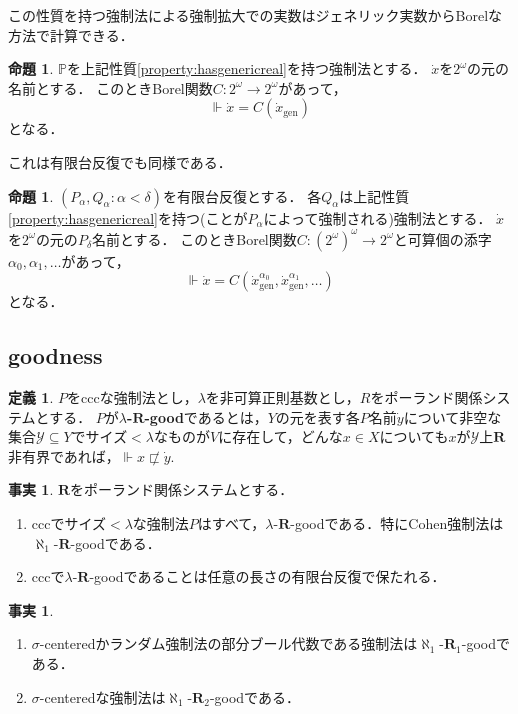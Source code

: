\documentclass[uplatex,dvipdfmx]{jsarticle}
\renewcommand{\P}{\mathbb{P}}
\newcommand\forces{\Vdash}
\newcommand{\relR}{\mathbf{R}}
\renewcommand\subset{\subseteq}
\theoremstyle{definition}
\newtheorem{defi}[thm]{定義}
\newtheorem{fact}[thm]{事実}
\newtheorem{prop}[thm]{命題}
\begin{document}
		この性質を持つ強制法による強制拡大での実数はジェネリック実数からBorelな方法で計算できる．
		\begin{prop}
			$\P$を上記性質\ref{property:hasgenericreal}を持つ強制法とする．
			$\dot{x}$を$2^\omega$の元の名前とする．
			このときBorel関数$C \colon 2^\omega \to 2^\omega$があって，
			\[
			\forces \dot{x} = C(\dot{x}_\mathrm{gen})
			\]
			となる．
		\end{prop}
	
		これは有限台反復でも同様である．
		\begin{prop}
		$(P_\alpha, Q_\alpha : \alpha < \delta)$を有限台反復とする．
		各$Q_\alpha$は上記性質\ref{property:hasgenericreal}を持つ(ことが$P_\alpha$によって強制される)強制法とする．
		$\dot{x}$を$2^\omega$の元の$P_\delta$名前とする．
		このときBorel関数$C \colon (2^\omega)^\omega \to 2^\omega$と可算個の添字$\alpha_0, \alpha_1, \dots$があって，
		\[
		\forces \dot{x} = C(\dot{x}_\mathrm{gen}^{\alpha_0}, \dot{x}_\mathrm{gen}^{\alpha_1}, \dots)
		\]
		となる．
		\end{prop}
		
	\subsection{goodness}
	
	\begin{defi}
		$P$をcccな強制法とし，$\lambda$を非可算正則基数とし，$R$をポーランド関係システムとする．
		$P$が\textbf{$\lambda$-$\relR$-good}であるとは，$Y$の元を表す各$P$名前$\dot{y}$について非空な集合$\mathscr{Y} \subset Y$でサイズ$<\lambda$なものが$V$に存在して，どんな$x \in X$についても$x$が$\mathscr{Y}$上$\relR$非有界であれば，$\forces x \not \sqsubset \dot{y}$.
	\end{defi}

	\begin{fact}
		$\relR$をポーランド関係システムとする．
		\begin{enumerate}
			\item cccでサイズ$< \lambda$な強制法$P$はすべて，$\lambda$-$\relR$-goodである．特にCohen強制法は$\aleph_1$-$\relR$-goodである．
			\item cccで$\lambda$-$\relR$-goodであることは任意の長さの有限台反復で保たれる．
		\end{enumerate}
	\end{fact}

	\begin{fact}\label{fact:goodness}
	\begin{enumerate}
		\item $\sigma$-centeredかランダム強制法の部分ブール代数である強制法は$\aleph_1$-$\relR_1$-goodである．
		\item $\sigma$-centeredな強制法は$\aleph_1$-$\relR_2$-goodである．
	\end{enumerate}
	\end{fact}
\end{document}
